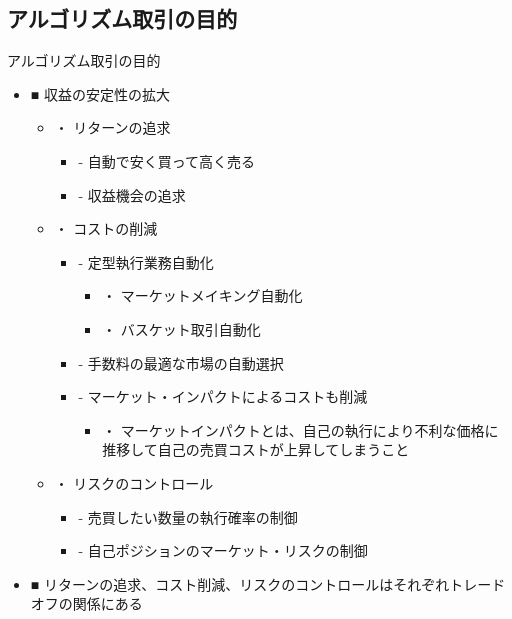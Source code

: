 \documentclass[dvipdfmx, autodetect-engine, aspectratio=169, 10.5pt]{beamer}
\begin{document}
\subsection{アルゴリズム取引の目的}
\begin{frame}{アルゴリズム取引の目的}
	\scriptsize
	\begin{itemize}
		\item ■ 収益の安定性の拡大
		      \begin{itemize}
			      \item ・ リターンの追求
			            \begin{itemize}
				            \item - 自動で安く買って高く売る
				            \item - 収益機会の追求
			            \end{itemize}
			      \item ・ コストの削減
			            \begin{itemize}
				            \item - 定型執行業務自動化
				                  \begin{itemize}
					                  \item ・ マーケットメイキング自動化
					                  \item ・ バスケット取引自動化
				                  \end{itemize}
				            \item - 手数料の最適な市場の自動選択
				            \item - マーケット・インパクトによるコストも削減
				                  \begin{itemize}
					                  \item ・ マーケットインパクトとは、自己の執行により不利な価格に推移して自己の売買コストが上昇してしまうこと
				                  \end{itemize}
			            \end{itemize}
			      \item ・ リスクのコントロール
			            \begin{itemize}
				            \item - 売買したい数量の執行確率の制御
				            \item - 自己ポジションのマーケット・リスクの制御
			            \end{itemize}
		      \end{itemize}
		\item ■ リターンの追求、コスト削減、リスクのコントロールはそれぞれトレードオフの関係にある
	\end{itemize}
\end{frame}
\end{document}
